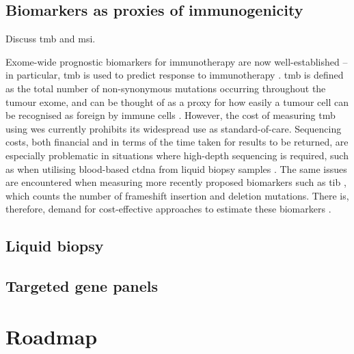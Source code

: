 \documentclass[../thesis.tex]{subfiles}
\begin{document}
\subsection{Biomarkers as proxies of immunogenicity}
Discuss \acrshort{tmb} and \acrshort{msi}.

Exome-wide prognostic biomarkers for immunotherapy are now well-established -- in particular, \gls{tmb} is used to predict response to immunotherapy \citep{zhu_association_2019, cao_high_2019}.  \gls{tmb} is defined as the total number of non-synonymous mutations occurring throughout the tumour exome, and can be thought of as a proxy for how easily a tumour cell can be recognised as foreign by immune cells \citep{chan_development_2019}. However, the cost of measuring \gls{tmb} using \gls{wes} \citep{sboner_real_2011} currently prohibits its widespread use as standard-of-care.  Sequencing costs, both financial and in terms of the time taken for results to be returned, are especially problematic in situations where high-depth sequencing is required, such as when utilising blood-based \gls{ctdna} from liquid biopsy samples \citep{gandara_blood-based_2018}. The same issues are encountered when measuring more recently proposed biomarkers such as \gls{tib} \citep{wu_tumor_2019,turajlic_insertion-and-deletion-derived_2017}, which counts the number of frameshift insertion and deletion mutations. There is, therefore, demand for cost-effective approaches to estimate these biomarkers \citep{fancello_tumor_2019, golkaram_interplay_2020}.

\subsection{Liquid biopsy}
\citep{jensen_association_2020} \citep{genovese_clonal_2014} \citep{razavi_high-intensity_2019} \citep{schweizer_clinical_2019} \citep{annala_circulating_2018} \citep{goodall_circulating_2017}
\subsection{Targeted gene panels}

\section{Roadmap}

\dobib %
\end{document}
